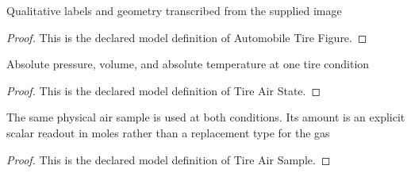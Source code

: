 \begin{definition}
  \label{def:physics:phyx-mini-0441:phyxminiproblems-problemphyxmini0441-automobiletirefigure}
  Qualitative labels and geometry transcribed from the supplied image
\end{definition}
\begin{proof}
  This is the declared model definition of Automobile Tire Figure.
\end{proof}
\begin{definition}
  \label{def:physics:phyx-mini-0441:phyxminiproblems-problemphyxmini0441-tireairstate}
  Absolute pressure, volume, and absolute temperature at one tire condition
\end{definition}
\begin{proof}
  This is the declared model definition of Tire Air State.
\end{proof}
\begin{definition}
  \label{def:physics:phyx-mini-0441:phyxminiproblems-problemphyxmini0441-tireairsample}
  The same physical air sample is used at both conditions. Its amount is an explicit scalar readout in moles rather than a replacement type for the gas
\end{definition}
\begin{proof}
  This is the declared model definition of Tire Air Sample.
\end{proof}
